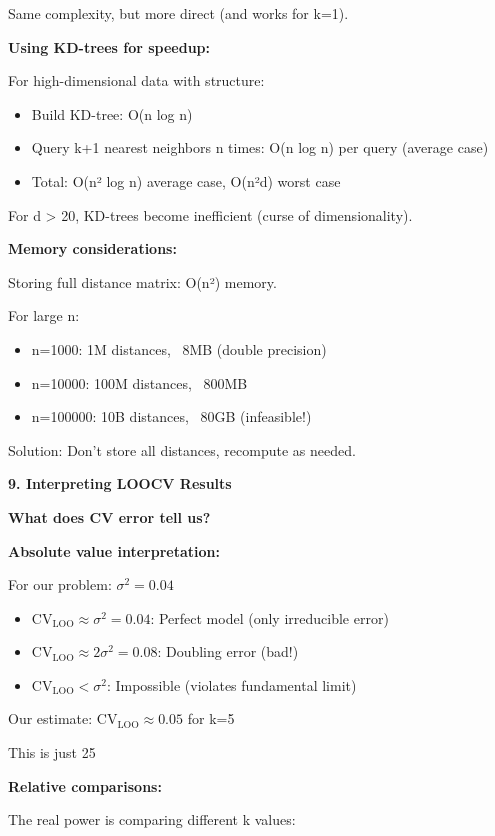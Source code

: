 \documentclass[12pt]{article}
\begin{document}
\begin{explanation}
Same complexity, but more direct (and works for k=1).

\textbf{Using KD-trees for speedup:}

For high-dimensional data with structure:
\begin{itemize}
    \item Build KD-tree: O(n log n)
    \item Query k+1 nearest neighbors n times: O(n log n) per query (average case)
    \item Total: O(n² log n) average case, O(n²d) worst case
\end{itemize}

For d > 20, KD-trees become inefficient (curse of dimensionality).

\textbf{Memory considerations:}

Storing full distance matrix: O(n²) memory.

For large n:
\begin{itemize}
    \item n=1000: 1M distances, ~8MB (double precision)
    \item n=10000: 100M distances, ~800MB
    \item n=100000: 10B distances, ~80GB (infeasible!)
\end{itemize}

Solution: Don't store all distances, recompute as needed.

\textbf{9. Interpreting LOOCV Results}

\textbf{What does CV error tell us?}

\textbf{Absolute value interpretation:}

For our problem: $\sigma^2 = 0.04$

\begin{itemize}
    \item $\text{CV}_{\text{LOO}} \approx \sigma^2 = 0.04$: Perfect model (only irreducible error)
    \item $\text{CV}_{\text{LOO}} \approx 2\sigma^2 = 0.08$: Doubling error (bad!)
    \item $\text{CV}_{\text{LOO}} < \sigma^2$: Impossible (violates fundamental limit)
\end{itemize}

Our estimate: $\text{CV}_{\text{LOO}} \approx 0.05$ for k=5

This is just 25%

\textbf{Relative comparisons:}

The real power is comparing different k values:


\end{explanation}
\end{document}
